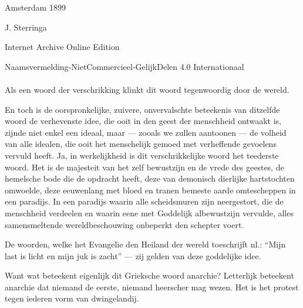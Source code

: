 \documentclass[a4paper, 12pt, oneside, dutch]{article}
\begin{document}
\begin{titlepage}
	
	
		
	\vspace*{\fill}%
	
	Amsterdam 1899 %
	
	{\small J. Sterringa } %

	\vspace{1\baselineskip} %

        Internet Archive Online Edition  %
	
	{\small Naamsvermelding-NietCommercieel-GelijkDelen 4.0 Internationaal } %
\end{titlepage}
\setlength{\parskip}{1mm plus1mm minus1mm}
\clearpage
\pagestyle{fancy}
\fancyhf{}
\cfoot{\Fontauri{\thepage}}
\Large
\paragraph{}
Als een woord der verschrikking klinkt dit woord tegenwoordig door de wereld.

En toch is de oorspronkelijke, zuivere, onvervalschte beteekenis van ditzelfde woord de verhevenste idee, die ooit in den geest der menschheid ontwaakt is, zijnde niet enkel een ideaal, maar --- zooals we zullen aantoonen --- de volheid van alle idealen, die ooit het menschelijk gemoed met verheffende gevoelens vervuld heeft. Ja, in werkelijkheid is dit verschrikkelijke woord het teederste woord. Het is de majesteit van het zelf bewustzijn en de vrede des geestes, de hemelsche bode die de opdracht heeft, deze van demonisch dierlijke hartstochten omwoelde, deze eeuwenlang met bloed en tranen bemeste aarde omtescheppen in een paradijs. In een paradijs waarin alle scheidsmuren zijn neergestort, die de menschheid verdeelen en waarin eene met Goddelijk albewustzijn vervulde, alles samensmeltende wereldbeschouwing onbeperkt den schepter voert.

De woorden, welke het Evangelie den Heiland der wereld toeschrijft nl.: "`Mijn last is licht en mijn juk is zacht"' --- zij gelden van deze goddelijke idee.

Want wat beteekent eigenlijk dit Grieksche woord anarchie? Letterlijk beteekent anarchie dat niemand de eerste, niemand heerscher mag wezen.
Het is het protest tegen iederen vorm van dwingelandij.
\end{document}
